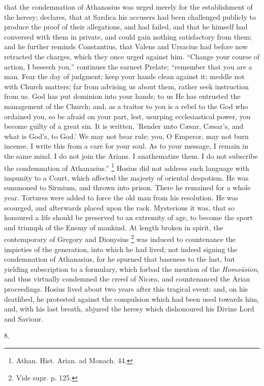 that the condemnation of Athanasius was urged merely for the
establishment of the heresy; declares, that at Sardica his accusers
had been challenged publicly to produce the proof of their
allegations, and had failed, and that he himself had conversed with
them in private, and could gain nothing satisfactory from them; and he
further reminds Constantius, that Valens and Ursacius had before now
retracted the charges, which they once urged against him. ``Change
your course of action, I beseech you,'' continues the earnest
Prelate; ``remember that you are a man. Fear the day of judgment;
keep your hands clean against it; meddle not with Church matters; far
from advising us about them, rather seek instruction from us. God has
put dominion into your hands; to us He has entrusted the management of
the Church; and, as a traitor to you is a rebel to the God who
ordained you, so be afraid on your part, lest, usurping ecclesiastical
power, you become guilty of a great sin. It is written, 'Render unto
Cæsar, Cæsar's, and what is God's, to God.' We may not bear rule;
you, O Emperor, may not burn incense. I write this from a care for
your soul. As to your message, I remain in the same mind. I do not
join the Arians. I anathematize them. I do not subscribe the
condemnation of Athanasius.'' \footnote{Athan. Hist. Arian. ad Monach. 44.} Hosius did not address such language with impunity to a Court,
which affected the majesty of oriental despotism. He was summoned to
Sirmium, and thrown into prison. There he remained for a whole year.
Tortures were added to force the old man from his resolution. He was
scourged, and afterwards placed upon the rack. Mysterious it was, that
so honoured a life should be preserved to an extremity of age, to
become the sport and triumph of the Enemy of mankind. At length broken
in spirit, the contemporary of Gregory and Dionysius \footnote{Vide supr. p. 125.} was induced to countenance the impieties of the generation,
into which he had lived; not indeed signing the condemnation of
Athanasius, for he spurned that baseness to the last, but yielding
subscription to a formulary, which forbad the mention of the \emph{Homoüsion},
and thus virtually condemned the creed of Nicæa, and countenanced the
Arian proceedings. Hosius lived about two years after this tragical
event: and, on his deathbed, he protested against the compulsion which
had been used towards him, and, with his last breath, abjured the
heresy which dishonoured his Divine Lord and Saviour.

8.


